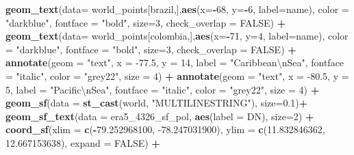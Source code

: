 \documentclass[12pt,twoside]{reedthesis}
\newenvironment{Shaded}{\begin{snugshade}}{\end{snugshade}}
\newcommand{\CharTok}[1]{\textcolor[rgb]{0.31,0.60,0.02}{#1}}
\newcommand{\DataTypeTok}[1]{\textcolor[rgb]{0.13,0.29,0.53}{#1}}
\newcommand{\DecValTok}[1]{\textcolor[rgb]{0.00,0.00,0.81}{#1}}
\newcommand{\FloatTok}[1]{\textcolor[rgb]{0.00,0.00,0.81}{#1}}
\newcommand{\KeywordTok}[1]{\textcolor[rgb]{0.13,0.29,0.53}{\textbf{#1}}}
\newcommand{\NormalTok}[1]{#1}
\newcommand{\OperatorTok}[1]{\textcolor[rgb]{0.81,0.36,0.00}{\textbf{#1}}}
\newcommand{\OtherTok}[1]{\textcolor[rgb]{0.56,0.35,0.01}{#1}}
\newcommand{\StringTok}[1]{\textcolor[rgb]{0.31,0.60,0.02}{#1}}
\begin{document}
\begin{Shaded}
\begin{Highlighting}[]
\StringTok{  }\KeywordTok{geom_text}\NormalTok{(}\DataTypeTok{data=}\NormalTok{ world_points[brazil,],}\KeywordTok{aes}\NormalTok{(}\DataTypeTok{x=}\OperatorTok{-}\DecValTok{68}\NormalTok{, }\DataTypeTok{y=}\OperatorTok{-}\DecValTok{6}\NormalTok{, }\DataTypeTok{label=}\NormalTok{name), }\DataTypeTok{color =} \StringTok{"darkblue"}\NormalTok{, }\DataTypeTok{fontface =} \StringTok{"bold"}\NormalTok{, }\DataTypeTok{size=}\DecValTok{3}\NormalTok{, }\DataTypeTok{check_overlap =} \OtherTok{FALSE}\NormalTok{) }\OperatorTok{+}
\StringTok{  }\KeywordTok{geom_text}\NormalTok{(}\DataTypeTok{data=}\NormalTok{ world_points[colombia,],}\KeywordTok{aes}\NormalTok{(}\DataTypeTok{x=}\OperatorTok{-}\DecValTok{71}\NormalTok{, }\DataTypeTok{y=}\DecValTok{4}\NormalTok{, }\DataTypeTok{label=}\NormalTok{name), }\DataTypeTok{color =} \StringTok{"darkblue"}\NormalTok{, }\DataTypeTok{fontface =} \StringTok{"bold"}\NormalTok{, }\DataTypeTok{size=}\DecValTok{3}\NormalTok{, }\DataTypeTok{check_overlap =} \OtherTok{FALSE}\NormalTok{) }\OperatorTok{+}
\StringTok{  }\KeywordTok{annotate}\NormalTok{(}\DataTypeTok{geom =} \StringTok{"text"}\NormalTok{, }\DataTypeTok{x =} \FloatTok{-77.5}\NormalTok{, }\DataTypeTok{y =} \DecValTok{14}\NormalTok{, }\DataTypeTok{label =} \StringTok{"Caribbean}\CharTok{\textbackslash{}n}\StringTok{Sea"}\NormalTok{, }\DataTypeTok{fontface =} \StringTok{"italic"}\NormalTok{, }\DataTypeTok{color =} \StringTok{"grey22"}\NormalTok{, }\DataTypeTok{size =} \DecValTok{4}\NormalTok{) }\OperatorTok{+}\StringTok{ }
\StringTok{  }\KeywordTok{annotate}\NormalTok{(}\DataTypeTok{geom =} \StringTok{"text"}\NormalTok{, }\DataTypeTok{x =} \FloatTok{-80.5}\NormalTok{, }\DataTypeTok{y =} \DecValTok{5}\NormalTok{, }\DataTypeTok{label =} \StringTok{"Pacific}\CharTok{\textbackslash{}n}\StringTok{Sea"}\NormalTok{, }\DataTypeTok{fontface =} \StringTok{"italic"}\NormalTok{, }\DataTypeTok{color =} \StringTok{"grey22"}\NormalTok{, }\DataTypeTok{size =} \DecValTok{4}\NormalTok{) }\OperatorTok{+}
\StringTok{  }\KeywordTok{geom_sf}\NormalTok{(}\DataTypeTok{data =} \KeywordTok{st_cast}\NormalTok{(world, }\StringTok{"MULTILINESTRING"}\NormalTok{),  }\DataTypeTok{size=}\FloatTok{0.1}\NormalTok{)}\OperatorTok{+}
\StringTok{  }\KeywordTok{geom_sf_text}\NormalTok{(}\DataTypeTok{data =}\NormalTok{ era5_}\DecValTok{4326}\NormalTok{_sf_pol, }\KeywordTok{aes}\NormalTok{(}\DataTypeTok{label =}\NormalTok{ DN), }\DataTypeTok{size=}\DecValTok{2}\NormalTok{) }\OperatorTok{+}
\StringTok{  }\KeywordTok{coord_sf}\NormalTok{(}\DataTypeTok{xlim =} \KeywordTok{c}\NormalTok{(}\OperatorTok{-}\FloatTok{79.252968100}\NormalTok{, }\FloatTok{-78.247031900}\NormalTok{), }\DataTypeTok{ylim =} \KeywordTok{c}\NormalTok{(}\FloatTok{11.832846362}\NormalTok{, }\FloatTok{12.667153638}\NormalTok{), }\DataTypeTok{expand =} \OtherTok{FALSE}\NormalTok{) }\OperatorTok{+}

\end{Highlighting}
\end{Shaded}
\end{document}
